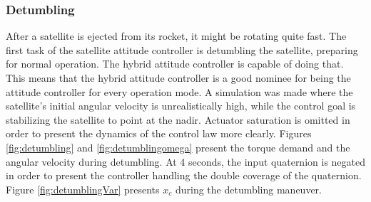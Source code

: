 
\subsubsection{Detumbling}

After a satellite is ejected from its rocket, it might be rotating quite fast. The first task of the satellite attitude controller is detumbling the satellite, preparing for normal operation. The hybrid attitude controller is capable of doing that. This means that the hybrid attitude controller is a good nominee for being the attitude controller for every operation mode. A simulation was made where the satellite's initial angular velocity is unrealistically high, while the control goal is stabilizing the satellite to point at the nadir. Actuator saturation is omitted in order to present the dynamics of the control law more clearly. Figures \ref{fig:detumbling} and \ref{fig:detumblingomega} present the torque demand and the angular velocity during detumbling. At 4 seconds, the input quaternion is negated in order to present the controller handling the double coverage of the quaternion. Figure \ref{fig:detumblingVar} presents $x_c$ during the detumbling maneuver.



